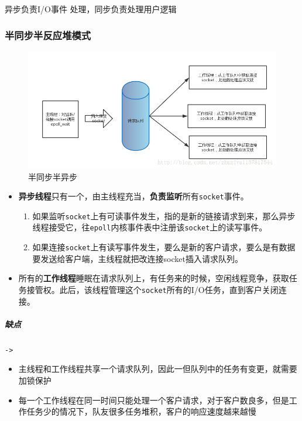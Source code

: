 \documentclass[UTF8,a4paper,8pt]{ctexbook}
\begin{document}
			异步负责I/O事件 处理，同步负责处理用户逻辑
			
			\subsubsection{半同步半反应堆模式}
				\begin{figure}[h]
					\centering
					\includegraphics[scale = 0.5]{half.png}
					\caption{半同步半异步}
				\end{figure}
				
				\begin{itemize}
					\item \textbf{异步线程}只有一个，由主线程充当，\textbf{负责监听}所有\verb|socket|事件。
						\begin{enumerate}
							\item 如果监听\verb|socket|上有可读事件发生，指的是新的链接请求到来，那么异步线程接受它，往\verb|epoll|内核事件表中注册该\verb|socket|上的读写事件。
							\item 如果连接\verb|socket|上有读写事件发生，要么是新的客户请求，要么是有数据要发送给客户端，主线程就把改连接socket插入请求队列。
						\end{enumerate}
					
					\item 所有的\textbf{工作线程}睡眠在请求队列上，有任务来的时候，空闲线程竞争，获取任务接管权。此后，该线程管理这个\verb|socket|所有的I/O任务，直到客户关闭连接。
				\end{itemize}
				
				\subparagraph{缺点}\verb|->|
					\begin{itemize}[itemindent = 1em]
						\item 主线程和工作线程共享一个请求队列，因此一但队列中的任务有变更，就需要加锁保护
						\item 每一个工作线程在同一时间只能处理一个客户请求，对于客户数良多，但是工作任务少的情况下，队友很多任务堆积，客户的响应速度越来越慢
					\end{itemize}
				
\end{document}
